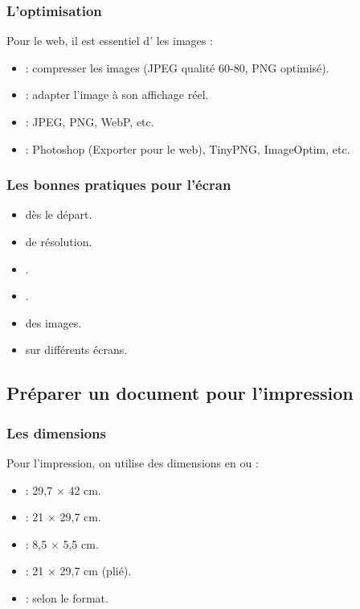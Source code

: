 \subsubsection{L'optimisation}

Pour le web, il est essentiel d' les images :

\begin{itemize}
    \item {} : compresser les images (JPEG qualité 60-80, PNG optimisé).
    \item {} : adapter l'image à son affichage réel.
    \item {} : JPEG, PNG, WebP, etc.
    \item {} : Photoshop (Exporter pour le web), TinyPNG, ImageOptim, etc.
\end{itemize}

\subsubsection{Les bonnes pratiques pour l'écran}

\begin{itemize}
    \item {} dès le départ.
    \item {} de résolution.
    \item {}.
    \item {}.
    \item {} des images.
    \item {} sur différents écrans.
\end{itemize}

\subsection{Préparer un document pour l'impression}

\subsubsection{Les dimensions}

Pour l'impression, on utilise des dimensions en  ou  :

\begin{itemize}
    \item {} : 29,7 × 42 cm.
    \item {} : 21 × 29,7 cm.
    \item {} : 8,5 × 5,5 cm.
    \item {} : 21 × 29,7 cm (plié).
    \item {} : selon le format.
\end{itemize}

